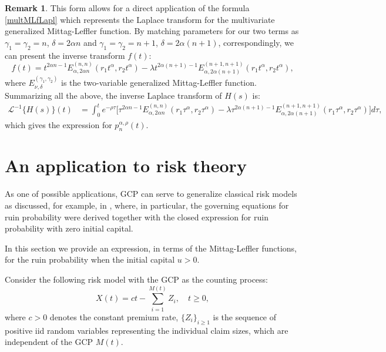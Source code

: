 \documentclass[12pt]{article}
\theoremstyle{definition}
\newtheorem{remark}{Remark}
\theoremstyle{plain}
\begin{document}
\begin{remark}
	This form allows for a direct application of the formula \eqref{multMLfLapl} which represents the Laplace transform for the multivariate generalized Mittag-Leffler function. 	
	By matching parameters for our two terms as 
	 $\gamma_1 = \gamma_2 = n$,   $\delta = 2\alpha n$ and 
		$\gamma_1 = \gamma_2 = n+1$,  $\delta = 2\alpha(n+1)$, correspondingly, 
	we can present the inverse transform $f(t)$:
	\begin{equation*}
		f(t) = t^{2\alpha n - 1} E_{\alpha, 2\alpha n}^{(n, n)}(r_1 t^\alpha, r_2 t^\alpha) - \lambda t^{2\alpha(n+1) - 1} E_{\alpha, 2\alpha(n+1)}^{(n+1, n+1)}(r_1 t^\alpha, r_2 t^\alpha),
	\end{equation*}
	where $E_{\nu,\delta}^{(\gamma_1, \gamma_2)}$ is the two-variable generalized Mittag-Leffler function.
	Summarizing all the above, the  inverse Laplace transform of $H(s)$ is:
	\begin{align*}
		\mathcal{L}^{-1}\{H(s)\}(t) &= \int_0^t e^{-\rho \tau} \bigg[ \tau^{2\alpha n - 1} E_{\alpha, 2\alpha n}^{(n, n)}(r_1 \tau^\alpha, r_2 \tau^\alpha) %
		- \lambda \tau^{2\alpha(n+1) - 1} E_{\alpha, 2\alpha(n+1)}^{(n+1, n+1)}(r_1 \tau^\alpha, r_2 \tau^\alpha) \bigg] d\tau,
	\end{align*}
	which gives the expression for ${p}^{\alpha,\rho}_n(t)$.
\end{remark}




\section{An application to risk theory}

As one of possible applications, GCP can serve to generalize classical risk models as discussed, for example, in \cite{KK2022b}, where, in particular,  the governing equations for ruin probability were derived together with the closed expression for ruin probability with zero initial capital. 

In this section we provide  an expression, in terms of the Mittag-Leffler functions, for the ruin probability when the initial capital $u>0$.

Consider the following risk model with the GCP as the counting process:
\begin{equation*}
	X(t) = ct - \sum_{i=1}^{M(t)} Z_i, \quad t \ge 0,
\end{equation*}
where $c > 0$ denotes the constant premium rate, $\{Z_i\}_{i \ge 1}$ is the sequence of positive iid random variables representing the individual claim sizes, which are independent of the GCP $M(t)$. 
\end{document}
